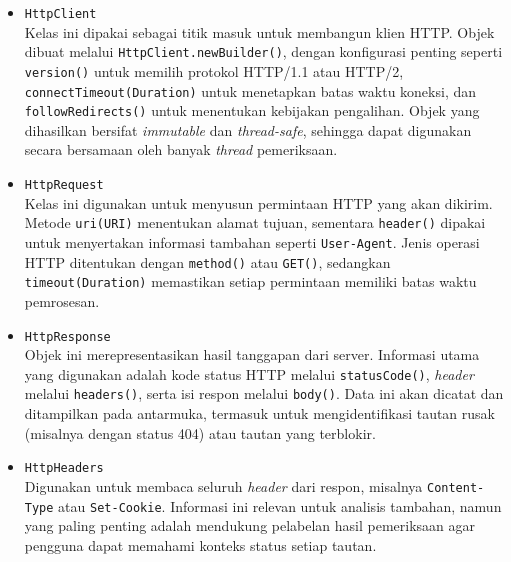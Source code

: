 \begin{itemize}
  \item \texttt{HttpClient}\\
  Kelas ini dipakai sebagai titik masuk untuk membangun klien HTTP. Objek dibuat melalui \texttt{HttpClient.newBuilder()}, dengan konfigurasi penting seperti \texttt{version()} untuk memilih protokol HTTP/1.1 atau HTTP/2, \texttt{connectTimeout(Duration)} untuk menetapkan batas waktu koneksi, dan \texttt{followRedirects()} untuk menentukan kebijakan pengalihan. Objek yang dihasilkan bersifat \textit{immutable} dan \textit{thread-safe}, sehingga dapat digunakan secara bersamaan oleh banyak \textit{thread} pemeriksaan.

  \item \texttt{HttpRequest}\\
  Kelas ini digunakan untuk menyusun permintaan HTTP yang akan dikirim. Metode \texttt{uri(URI)} menentukan alamat tujuan, sementara \texttt{header()} dipakai untuk menyertakan informasi tambahan seperti \texttt{User-Agent}. Jenis operasi HTTP ditentukan dengan \texttt{method()} atau \texttt{GET()}, sedangkan \texttt{timeout(Duration)} memastikan setiap permintaan memiliki batas waktu pemrosesan.

  \item \texttt{HttpResponse}\\
  Objek ini merepresentasikan hasil tanggapan dari server. Informasi utama yang digunakan adalah kode status HTTP melalui \texttt{statusCode()}, \textit{header} melalui \texttt{headers()}, serta isi respon melalui \texttt{body()}. Data ini akan dicatat dan ditampilkan pada antarmuka, termasuk untuk mengidentifikasi tautan rusak (misalnya dengan status 404) atau tautan yang terblokir.

  \item \texttt{HttpHeaders}\\
  Digunakan untuk membaca seluruh \textit{header} dari respon, misalnya \texttt{Content-Type} atau \texttt{Set-Cookie}. Informasi ini relevan untuk analisis tambahan, namun yang paling penting adalah mendukung pelabelan hasil pemeriksaan agar pengguna dapat memahami konteks status setiap tautan.
\end{itemize}